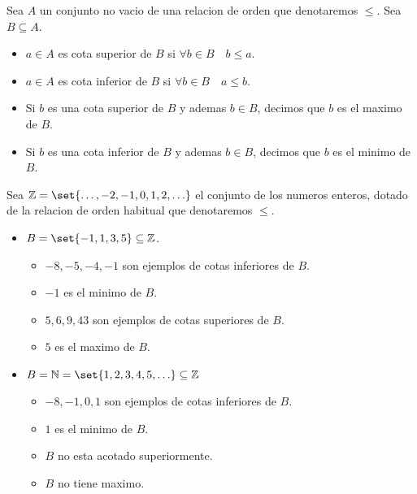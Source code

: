 \begin{definition}
	Sea \(A \) un conjunto no vacio de una relacion de orden que denotaremos \(\leq \). Sea \(B \subseteq A \).
	\begin{itemize}
		\item \(a \in A \) es cota superior de \(B \) si \(\forall  b \in B \quad b \leq a\).
		\item \(a \in A\) es cota inferior de \(B \) si \(\forall b \in B \quad a \leq b \).
		\item Si \(b \) es una cota superior de \(B \) y ademas \(b \in B \), decimos que \(b \) es el maximo de \(B \).
		\item Si \(b \) es una cota inferior de \(B \) y ademas \(b \in B \), decimos que \(b \) es el minimo de \(B \).
	\end{itemize}
\end{definition}

\begin{example}
	Sea \(\Z = \set{\ldots,-2,-1,0,1,2,\ldots }\) el conjunto de los numeros enteros, dotado de la relacion de orden habitual que denotaremos \(\leq  \).
	\begin{itemize}
		\item \(B = \set{-1,1,3,5} \subseteq \Z \). \begin{itemize}
			      \item \(-8,-5,-4,-1 \) son ejemplos de cotas inferiores de \(B \).
			      \item \(-1 \) es el minimo de \(B \).
			      \item \(5,6,9,43 \) son ejemplos de cotas superiores de \(B \).
			      \item \(5 \) es el maximo de \(B \).
		      \end{itemize}
		\item \(B = \N = \set{1,2,3,4,5,\ldots } \subseteq \Z\) \begin{itemize}
			      \item \(-8,-1,0,1 \) son ejemplos de cotas inferiores de \(B \).
			      \item \(1 \) es el minimo de \(B \).
			      \item \(B \) no esta acotado superiormente.
			      \item \(B \) no tiene maximo.
		      \end{itemize}
	\end{itemize}
\end{example}

